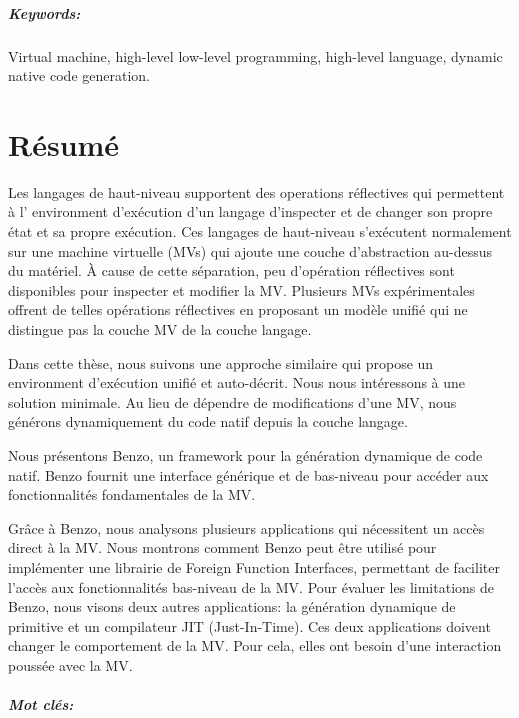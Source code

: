 \documentclass[a4paper,11pt,twoside]{include/ThesisStyle}
\begin{document}
\paragraph{Keywords:} Virtual machine, high-level low-level programming, high-level language, dynamic native code generation.

\cleardoublepage
\chapter*{Résumé}
Les langages de haut-niveau supportent des operations réflectives qui permettent à l’ environment d’exécution d’un langage d’inspecter et de changer son propre état et sa propre exécution. Ces langages de haut-niveau s’exécutent normalement sur une machine virtuelle (MVs) qui ajoute une couche d’abstraction au-dessus du matériel. À cause de cette séparation, peu d’opération réflectives sont disponibles pour inspecter et modifier la MV. Plusieurs MVs expérimentales offrent de telles opérations réflectives en proposant un modèle unifié qui ne distingue pas la couche MV de la couche langage. 

Dans cette thèse, nous suivons une approche similaire qui propose un environment d’exécution unifié et auto-décrit. Nous nous intéressons à une solution minimale. Au lieu de dépendre de modifications d’une MV, nous générons dynamiquement du code natif depuis la couche langage. 

Nous présentons Benzo, un framework pour la génération dynamique de code natif. Benzo fournit une interface générique et de bas-niveau pour accéder aux fonctionnalités fondamentales de la MV.

Grâce à Benzo, nous analysons plusieurs applications qui nécessitent un accès direct à la MV. Nous montrons comment Benzo peut être utilisé pour implémenter une librairie de Foreign Function Interfaces, permettant de faciliter l’accès aux fonctionnalités bas-niveau de la MV. Pour évaluer les limitations de Benzo, nous visons deux autres applications: la génération dynamique de primitive et un compilateur JIT (Just-In-Time). Ces deux applications doivent changer le comportement de la MV. Pour cela, elles ont besoin d’une interaction poussée avec la MV.

\paragraph{Mot clés:}
 
\end{document}
